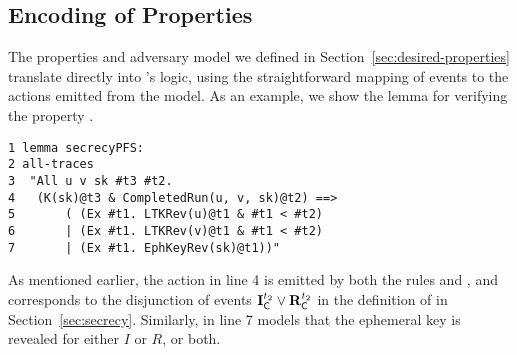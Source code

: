 \subsection{\mTamarin{} Encoding of Properties}
\label{sec:propertyFormalization}
The properties and adversary model we defined in
Section~\ref{sec:desired-properties} translate directly into \mTamarin's logic,
using the straightforward mapping of events to the actions emitted from the model.
%
As an example, we show the lemma for verifying the property \mPredPfs.
%
\begin{small}
\begin{verbatim}
1 lemma secrecyPFS:
2 all-traces
3  "All u v sk #t3 #t2.
4   (K(sk)@t3 & CompletedRun(u, v, sk)@t2) ==>
5       ( (Ex #t1. LTKRev(u)@t1 & #t1 < #t2)
6       | (Ex #t1. LTKRev(v)@t1 & #t1 < #t2)
7       | (Ex #t1. EphKeyRev(sk)@t1))"
\end{verbatim}
\end{small}
%
As mentioned earlier, the action  in line 4 is
emitted by both the rules  and , and corresponds
to the disjunction of events $\mathbf{I}_{\textsf{C}}^{t_2} \lor \mathbf{R}_{\textsf{C}}^{t_2}$ in the
definition of \mPredPfs{} in Section~\ref{sec:secrecy}.
%
Similarly,  in line 7 models that the ephemeral
key is revealed for either $I$ or $R$, or both.
%

%



